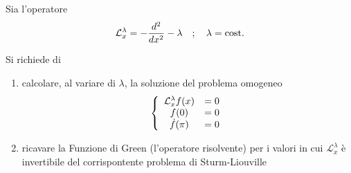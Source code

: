 Sia l'operatore
\begin{align}
	\mathcal{L}_x^\lambda = -\frac{d^2}{dx^2} - \lambda \quad ; \quad \lambda= \text{cost.}
\end{align}

Si richiede di
\begin{enumerate}
	\item calcolare, al variare di $\lambda$, la soluzione del problema omogeneo
	\begin{align}
		\left\{ \begin{array}{ccc} \mathcal{L}_x^\lambda f(x) &= 0\\ f(0) &=0\\ \dot{f}(\pi) &=0 \end{array} \right.
	\end{align}
	\item ricavare la Funzione di Green (l'operatore risolvente) per i valori in cui $\mathcal{L}_x^\lambda$ è invertibile del corrispontente problema di Sturm-Liouville
\end{enumerate}


